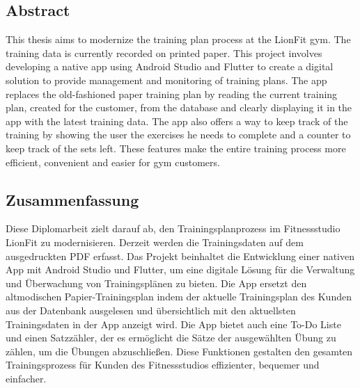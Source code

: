 \begin{spacing}{1}
    \chapter*{Abstract}
\end{spacing}
This thesis aims to modernize the training plan process at the LionFit gym.
\newline
The training data is currently recorded on printed paper.
\newline
This project involves developing a native app using Android Studio and Flutter to create a digital solution to provide management and monitoring of training plans.
\newline
The app replaces the old-fashioned paper training plan by reading the current training plan, created for the customer, from the database and clearly displaying it in the app with the latest training data.
\newline
The app also offers a way to keep track of the training by showing the user the exercises he needs to complete and a counter to keep track of the sets left.
\newline
These features make the entire training process more efficient, convenient and easier for gym customers.
\newpage
{}
\begin{spacing}{1}
    \chapter*{Zusammenfassung}
\end{spacing}
Diese Diplomarbeit zielt darauf ab, den Trainingsplanprozess im Fitnessstudio LionFit zu modernisieren. 
\newline
Derzeit werden die Trainingsdaten auf dem ausgedruckten PDF erfasst.
\newline
Das Projekt beinhaltet die Entwicklung einer nativen App mit Android Studio und Flutter, um eine digitale Lösung für 
die Verwaltung und Überwachung von Trainingsplänen zu bieten. 
\newline
Die App ersetzt den altmodischen Papier-Trainingsplan indem der aktuelle Trainingsplan des Kunden aus der Datenbank ausgelesen und übersichtlich mit den aktuellsten Trainingsdaten in der App anzeigt wird.
\newline 
Die App bietet auch eine To-Do Liste und einen Satzzähler, der es ermöglicht die Sätze der ausgewählten Übung zu zählen, um die Übungen abzuschließen.
\newline
Diese Funktionen gestalten den gesamten Trainingsprozess für Kunden des Fitnessstudios effizienter, bequemer und einfacher.

